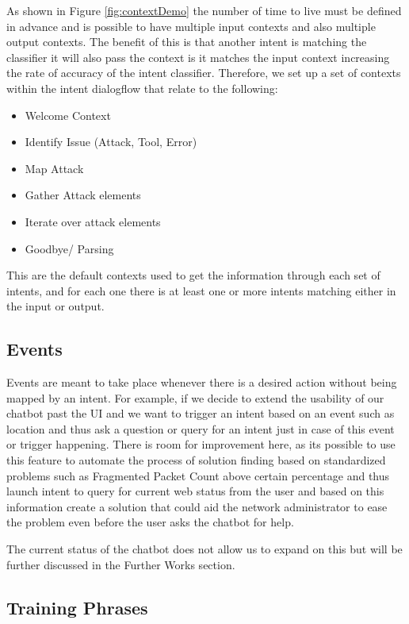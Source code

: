 As shown in Figure \ref{fig:contextDemo} the number of time to live must be defined in advance and is possible to have multiple input contexts and also multiple output contexts. The benefit of this is that another intent is matching the classifier it will also pass the context is it matches the input context increasing the rate of accuracy of the intent classifier. Therefore, we set up a set of contexts within the intent dialogflow that relate to the following:

\begin{itemize}
    \item Welcome Context
    \item Identify Issue (Attack, Tool, Error)
    \item Map Attack
    \item Gather Attack elements
    \item Iterate over attack elements
    \item Goodbye/ Parsing
\end{itemize}{}

This are the default contexts used to get the information through each set of intents, and for each one there is at least one or more intents matching either in the input or output.
\subsection{Events}
Events are meant to take place whenever there is a desired action without being mapped by an intent. For example, if we decide to extend the usability of our chatbot past the UI and we want to trigger an intent based on an event such as location and thus ask a question or query for an intent just in case of this event or trigger happening. There is room for improvement here, as its possible to use this feature to automate the process of solution finding based on standardized problems such as Fragmented Packet Count above certain percentage and thus launch intent to query for current web status from the user and based on this information create a solution that could aid the network administrator to ease the problem even before the user asks the chatbot for help.

The current status of the chatbot does not allow us to expand on this but will be further discussed in the Further Works section.
\subsection{Training Phrases}

